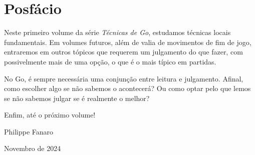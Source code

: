 \chapter{Posfácio}

Neste primeiro volume da série \emph{Técnicas de Go}, estudamos técnicas locais fundamentais. Em volumes futuros, além de valia de movimentos de fim de jogo, entraremos em outros tópicos que requerem um julgamento do que fazer, com possivelmente mais de uma opção, o que é o mais típico em partidas.

No Go, é sempre necessária uma conjunção entre leitura e julgamento. Afinal, como escolher algo se não sabemos o acontecerá? Ou como optar pelo que lemos se não sabemos julgar se é realmente o melhor?

\bigskip
\bigskip
\smallskip

Enfim, até o próximo volume!

\bigskip
\bigskip
\smallskip

\hspace*{\fill} Philippe Fanaro \hspace{0.055cm}

\hspace*{\fill} Novembro de 2024 \hspace{0.05cm}

\clearedpage